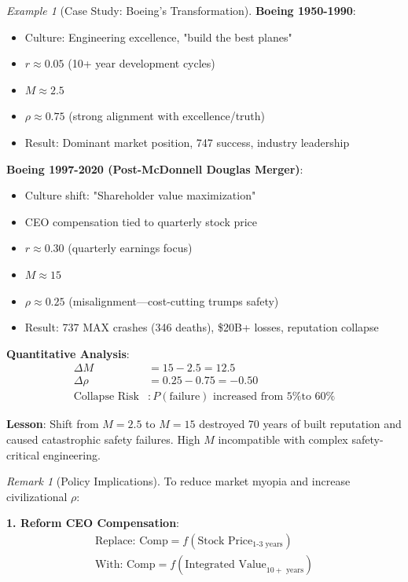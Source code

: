 \documentclass[11pt,a4paper]{article}
\theoremstyle{definition}
\theoremstyle{remark}
\newtheorem{remark}{Remark}[section]
\newtheorem{example}{Example}[section]
\begin{document}
\begin{small}
\begin{enumerate}
\begin{example}[Case Study: Boeing's Transformation]
\textbf{Boeing 1950-1990}:
\begin{itemize}
    \item Culture: Engineering excellence, "build the best planes"
    \item \(r \approx 0.05\) (10+ year development cycles)
    \item \(M \approx 2.5\)
    \item \(\rho \approx 0.75\) (strong alignment with excellence/truth)
    \item Result: Dominant market position, 747 success, industry leadership
\end{itemize}

\textbf{Boeing 1997-2020 (Post-McDonnell Douglas Merger)}:
\begin{itemize}
    \item Culture shift: "Shareholder value maximization"
    \item CEO compensation tied to quarterly stock price
    \item \(r \approx 0.30\) (quarterly earnings focus)
    \item \(M \approx 15\)
    \item \(\rho \approx 0.25\) (misalignment—cost-cutting trumps safety)
    \item Result: 737 MAX crashes (346 deaths), \$20B+ losses, reputation collapse
\end{itemize}

\textbf{Quantitative Analysis}:
\begin{align}
\Delta M &= 15 - 2.5 = 12.5 \\
\Delta \rho &= 0.25 - 0.75 = -0.50 \\
\text{Collapse Risk} &: P(\text{failure}) \text{ increased from 5\% to 60\%}
\end{align}

\textbf{Lesson}: Shift from \(M = 2.5\) to \(M = 15\) destroyed 70 years of built reputation and caused catastrophic safety failures. High \(M\) incompatible with complex safety-critical engineering.
\end{example}

\begin{remark}[Policy Implications]
To reduce market myopia and increase civilizational \(\rho\):

\textbf{1. Reform CEO Compensation}:
\begin{align}
\text{Replace: } \text{Comp} = f(\text{Stock Price}_{\text{1-3 years}}) \\
\text{With: } \text{Comp} = f(\text{Integrated Value}_{10+ \text{ years}})
\end{align}


\end{remark}
\end{enumerate}
\end{small}
\end{document}
